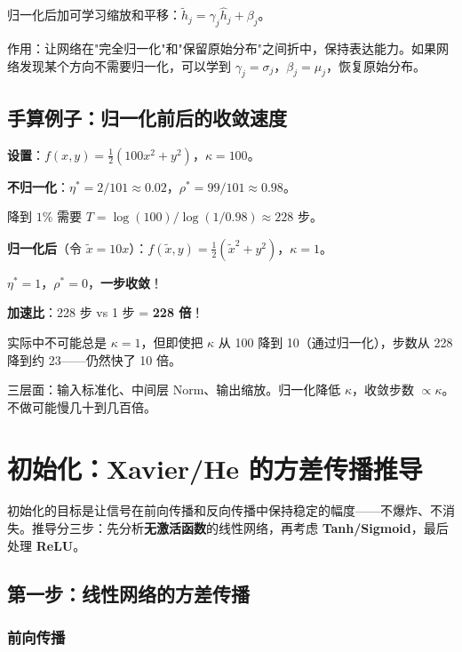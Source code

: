 \documentclass[12pt, a4paper]{ctexart}
\begin{document}
归一化后加可学习缩放和平移：$\tilde{h}_j = \gamma_j \hat{h}_j + \beta_j$。

作用：让网络在"完全归一化"和"保留原始分布"之间折中，保持表达能力。如果网络发现某个方向不需要归一化，可以学到 $\gamma_j = \sigma_j$，$\beta_j = \mu_j$，恢复原始分布。

\subsection{手算例子：归一化前后的收敛速度}

\textbf{设置}：$f(x,y) = \frac{1}{2}(100x^2 + y^2)$，$\kappa = 100$。

\textbf{不归一化}：$\eta^* = 2/101 \approx 0.02$，$\rho^* = 99/101 \approx 0.98$。

降到 $1\%$ 需要 $T = \log(100)/\log(1/0.98) \approx 228$ 步。

\textbf{归一化后}（令 $\tilde{x} = 10x$）：$f(\tilde{x},y) = \frac{1}{2}(\tilde{x}^2 + y^2)$，$\kappa = 1$。

$\eta^* = 1$，$\rho^* = 0$，\textbf{一步收敛}！

\textbf{加速比}：228 步 vs 1 步 = \textbf{228 倍}！

实际中不可能总是 $\kappa = 1$，但即使把 $\kappa$ 从 100 降到 10（通过归一化），步数从 228 降到约 23——仍然快了 10 倍。

\begin{keypoint}[数据归一化对训练至关重要]
三层面：输入标准化、中间层 Norm、输出缩放。归一化降低 $\kappa$，收敛步数 $\propto \kappa$。不做可能慢几十到几百倍。
\end{keypoint}

\section{初始化：Xavier/He 的方差传播推导}

初始化的目标是让信号在前向传播和反向传播中保持稳定的幅度——不爆炸、不消失。推导分三步：先分析\textbf{无激活函数}的线性网络，再考虑 \textbf{Tanh/Sigmoid}，最后处理 \textbf{ReLU}。

\subsection{第一步：线性网络的方差传播}

\subsubsection{前向传播}
\end{document}
